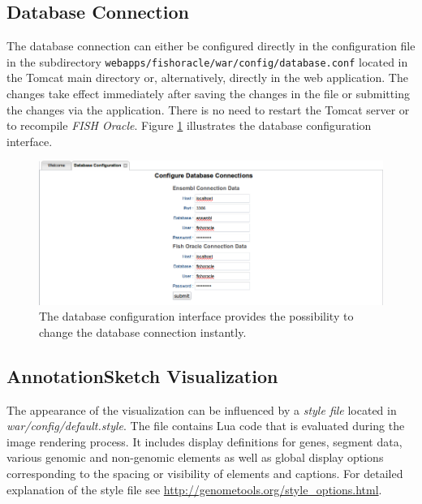 \documentclass[11pt,final]{article}
\newcommand{\FO}[0]{\emph{FISH Oracle}\xspace}
\begin{document}

\subsection{Database Connection}

The database connection can either be configured directly in the configuration
file in the subdirectory \texttt{webapps/fishoracle/war/config/database.conf}
located in the Tomcat main directory or, alternatively, directly in the web
application.
The changes take effect immediately after saving the changes in the file or
submitting the changes via the application. There is no need to restart the
Tomcat server or to recompile \FO. Figure \ref{fig:dbconfig}
illustrates the database configuration interface.

\begin{figure}[h]
	\begin{center}
		\includegraphics[width=\textwidth]{fig/dbconfig.png}
	\end{center}
	\caption{The database configuration interface provides the possibility
	         to change the database connection instantly.}
	\label{fig:dbconfig}
\end{figure}

\subsection{AnnotationSketch Visualization}

The appearance of the visualization can be influenced by a \emph{style file}
located in \textit{war/config/default.style}. The file contains Lua code that
is evaluated during the image rendering process. It includes display
definitions for genes, segment data, various genomic and non-genomic elements
as well as global display options corresponding to the spacing or visibility
of elements and captions. For detailed explanation of the style file see
\url{http://genometools.org/style_options.html}.
\end{document}
